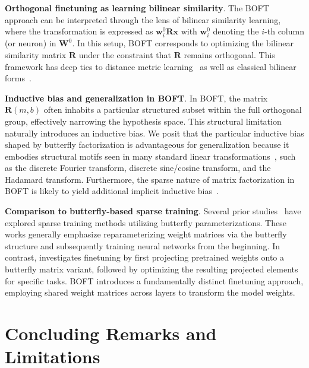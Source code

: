 \textbf{Orthogonal finetuning as learning bilinear similarity}. The BOFT approach can be interpreted through the lens of bilinear similarity learning, where the transformation is expressed as $\bm{w}^0_i\bm{R}\bm{x}$ with $\bm{w}^0_i$ denoting the $i$-th column (or neuron) in $\bm{W}^0$. In this setup, BOFT corresponds to optimizing the bilinear similarity matrix $\bm{R}$ under the constraint that $\bm{R}$ remains orthogonal. This framework has deep ties to distance metric learning~\cite{xing2002distance} as well as classical bilinear forms~\cite{roman2005advanced}.

\textbf{Inductive bias and generalization in BOFT}. In BOFT, the matrix $\bm{R}(m,b)$ often inhabits a particular structured subset within the full orthogonal group, effectively narrowing the hypothesis space. This structural limitation naturally introduces an inductive bias. We posit that the particular inductive bias shaped by butterfly factorization is advantageous for generalization because it embodies structural motifs seen in many standard linear transformations~\cite{dao2019kaleidoscope}, such as the discrete Fourier transform, discrete sine/cosine transform, and the Hadamard transform. Furthermore, the sparse nature of matrix factorization in BOFT is likely to yield additional implicit inductive bias~\cite{gunasekar2017implicit,li2018algorithmic,liu2019neural}.

\textbf{Comparison to butterfly-based sparse training}. Several prior studies~\cite{dao2019learning,dao2019kaleidoscope,chen2022pixelated,dao2022monarch} have explored sparse training methods utilizing butterfly parameterizations. These works generally emphasize reparameterizing weight matrices via the butterfly structure and subsequently training neural networks from the beginning. In contrast, \cite{dao2022monarch} investigates finetuning by first projecting pretrained weights onto a butterfly matrix variant, followed by optimizing the resulting projected elements for specific tasks. BOFT introduces a fundamentally distinct finetuning approach, employing shared weight matrices across layers to transform the model weights.



\section{Concluding Remarks and Limitations}

